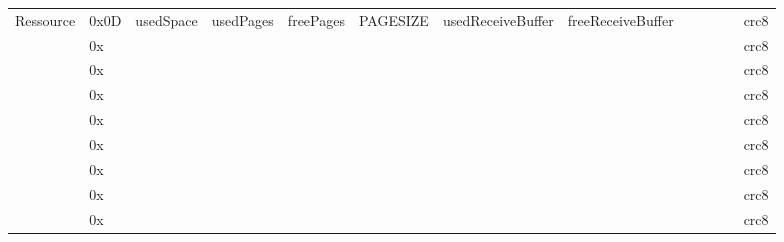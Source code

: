 \begin{landscape}
\begin{footnotesize}
\begin{tabular}{lllllllllllll}
Ressource &
    0x0D &
    usedSpace &
    usedPages &
    freePages &
    PAGESIZE &
    usedReceiveBuffer &
    freeReceiveBuffer &
     &
     &
     &
     &
    crc8 \\
 &
    0x &
     &
     &
     &
     &
     &
     &
     &
     &
     &
     &
    crc8 \\
 &
    0x &
     &
     &
     &
     &
     &
     &
     &
     &
     &
     &
    crc8 \\
 &
    0x &
     &
     &
     &
     &
     &
     &
     &
     &
     &
     &
    crc8 \\
 &
    0x &
     &
     &
     &
     &
     &
     &
     &
     &
     &
     &
    crc8 \\
 &
    0x &
     &
     &
     &
     &
     &
     &
     &
     &
     &
     &
    crc8 \\
 &
    0x &
     &
     &
     &
     &
     &
     &
     &
     &
     &
     &
    crc8 \\
 &
    0x &
     &
     &
     &
     &
     &
     &
     &
     &
     &
     &
    crc8 \\
 &
    0x &
     &
     &
     &
     &
     &
     &
     &
     &
     &
     &
    crc8 \\

\end{tabular}
\end{footnotesize}
\end{landscape}
